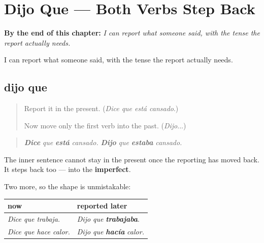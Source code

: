 
\chapter{Dijo Que --- Both Verbs Step Back}
\label{ch:dijo-que}

\begin{chapteropening}
\textbf{By the end of this chapter:} \emph{I can report what someone said, with the tense the report actually needs.}

I can report what someone said, with the tense the report actually needs.
\end{chapteropening}

\section[dijo que]{dijo que}

\label{lesson:ES-C57-dijo-que}



\begin{quote}
Report it in the present. (\emph{Dice que está cansado}.)

Now move only the first verb into the past. (\emph{Dijo}...)
\end{quote}

\begin{grammarlens}[title={Grammar Lens: both verbs move}]
\begin{quote}
\emph{\textbf{Dice}} \emph{que} \emph{\textbf{está}} \emph{cansado.} \emph{\textbf{Dijo}} \emph{que} \emph{\textbf{estaba}} \emph{cansado.}
\end{quote}

The inner sentence cannot stay in the present once the reporting has moved back. It steps back too — into the \textbf{imperfect}.

Two more, so the shape is unmistakable:

\noindent
\begin{tabularx}{\linewidth}{@{}>{\raggedright\arraybackslash}X>{\raggedright\arraybackslash}X@{}}
\toprule
\textbf{now} & \textbf{reported later} \\
\midrule
\emph{Dice que trabaja.} & \emph{Dijo que} \emph{\textbf{trabajaba}}. \\
\emph{Dice que hace calor.} & \emph{Dijo que} \emph{\textbf{hacía}} \emph{calor.} \\
\bottomrule
\end{tabularx}
\end{grammarlens}

